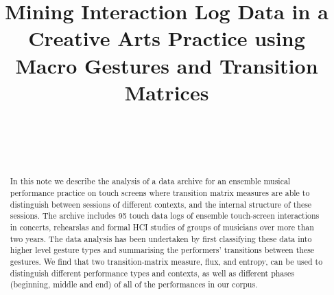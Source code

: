 \documentclass{sigchi}
\begin{document}
 
\title{Mining Interaction Log Data in a Creative Arts Practice using Macro Gestures and Transition Matrices}



\author{%
  \\
  \\
  \\
}

\maketitle

\begin{abstract}
  In this note we describe the analysis of a data archive for an
  ensemble musical performance practice on touch screens where
  transition matrix measures are able to distinguish between sessions
  of different contexts, and the internal structure of these sessions.
  The archive includes 95 touch data logs of ensemble touch-screen
  interactions in concerts, rehearslas and formal HCI studies of
  groups of musicians over more than two years.
  The data analysis has been undertaken by first classifying these
  data into higher level gesture types and summarising the performers'
  transitions between these gestures.
  We find that two transition-matrix measure, flux, and entropy,
  can be used to distinguish different performance types and contexts,
  as well as different phases (beginning, middle and end) of all of
  the performances in our corpus.
\end{abstract}

\end{document}
